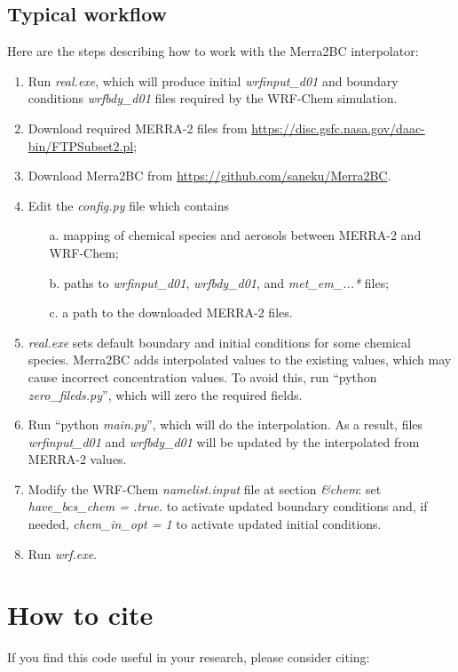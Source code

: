 \documentclass{article}
\begin{document}
\subsection{Typical workflow}

Here are the steps describing how to work with the {Merra2BC} interpolator:
\begin{enumerate}
\item Run \textit{real.exe}, which will produce initial \textit{wrfinput\_d01} and boundary conditions \textit{wrfbdy\_d01} files required by the WRF-Chem simulation.
\item Download required MERRA-2 files from \url{https://disc.gsfc.nasa.gov/daac-bin/FTPSubset2.pl};
\item Download {Merra2BC} from \url{https://github.com/saneku/Merra2BC}.
\item Edit the \textit{config.py} file which contains
\begin{itemize}
\item[a.] mapping of chemical species and aerosols between MERRA-2 and WRF-Chem;
\item[b.] paths to \textit{wrfinput\_d01}, \textit{wrfbdy\_d01}, and \textit{met\_em\_...*} files;
\item[c.] a path to the downloaded MERRA-2 files.
\end{itemize}
\item \textit{real.exe} sets default boundary and initial conditions for some chemical species.  {Merra2BC} adds interpolated values to the existing values, which may cause incorrect concentration values. To avoid this, run ``python \textit{zero\_fileds.py}'', which will zero the required fields.
\item Run ``python \textit{main.py}'', which will do the interpolation. As a result, files \textit{wrfinput\_d01} and \textit{wrfbdy\_d01} will be updated by the interpolated from MERRA-2 values.
\item Modify the WRF-Chem \textit{namelist.input} file at section \textit{\&chem}: set \textit{have\_bcs\_chem = .true.} to activate updated boundary conditions and, if needed, \textit{chem\_in\_opt = 1} to activate updated initial conditions.
\item Run \textit{wrf.exe}.
\end{enumerate}

\section{How to cite}
If you find this code useful in your research, please consider citing:

\hack{\newpage}



\end{document}
